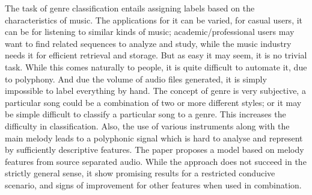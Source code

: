 \documentclass[12pt,journal,compsoc]{IEEEtran}
\begin{document}
% 
% 
% 
% 
The task of genre classification entails assigning labels based on the characteristics of music. The applications for it can be varied, for casual users, it can be for listening to similar kinds of music; academic/professional users may want to find related sequences to analyze and study, while the music industry needs it for efficient retrieval and storage. But as easy it may seem, it is no trivial task. While this comes naturally to people, it is quite difficult to automate it, due to polyphony. And due the volume of audio files generated, it is simply impossible to label everything by hand. The concept of genre is very subjective, a particular song could be a combination of two or more different styles; or it may be simple difficult to classify a particular song to a genre. This increases the difficulty in classification. Also, the use of various instruments along with the main melody leads to a polyphonic signal which is hard to analyse and represent by sufficiently descriptive features. The paper proposes a model based on melody features from source separated audio. While the approach does not succeed in the strictly general sense, it show promising results for a restricted conducive scenario, and signs of improvement for other features when used in combination.




%
%
\end{document}
